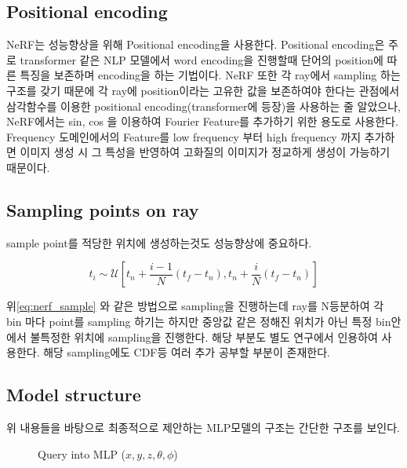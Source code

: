 \documentclass{vipweekly}
\begin{document}
\subsection{Positional encoding}

NeRF\cite{nerf}는 성능향상을 위해 Positional encoding을 사용한다. Positional encoding은 주로 transformer 같은
NLP 모델에서 word encoding을 진행할때 단어의 position에 따른 특징을 보존하며 encoding을 하는 기법이다.
NeRF 또한 각 ray에서 sampling 하는 구조를 갖기 때문에 각 ray에 position이라는 고유한 값을 보존하여야 한다는 관점에서
삼각함수를 이용한 positional encoding(transformer에 등장)을 사용하는 줄 알았으나, 
NeRF에서는 sin, cos 을 이용하여 Fourier Feature를 추가하기 위한 용도로 사용한다. 
Frequency 도메인에서의 Feature를 low frequency 부터 high frequency 까지 추가하면 
이미지 생성 시 그 특성을 반영하여 고화질의 이미지가 정교하게 생성이 가능하기 때문이다.

\subsection{Sampling points on ray} 

sample point를 적당한 위치에 생성하는것도 성능향상에 중요하다.

\begin{equation}
    t_{i} \sim \mathcal{U}\left[t_{n}+\frac{i-1}{N}\left(t_{f}-t_{n}\right), t_{n}+\frac{i}{N}\left(t_{f}-t_{n}\right)\right]
    \label{eq:nerf_sample}
\end{equation}
    
위\eqref{eq:nerf_sample} 와 같은 방법으로 sampling을 진행하는데 ray를 N등분하여 각 bin 
마다 point를 sampling 하기는 하지만 중앙값 같은 정해진 위치가 아닌 특정 
bin안에서 불특정한 위치에 sampling을 진행한다. 해당 부분도 별도 연구에서 인용하여 사용한다.
해당 sampling에도 CDF등 여러 추가 공부할 부분이 존재한다.


\subsection{Model structure} 

위 내용들을 바탕으로 최종적으로 제안하는 MLP모델의 구조는 간단한 구조를 보인다.

\begin{figure}[h]
    \centering
    \hfill
    \caption{Query into MLP ($x , y , z , \theta ,\phi $)}
    \label{fig:network}
\end{figure}
\end{document}
